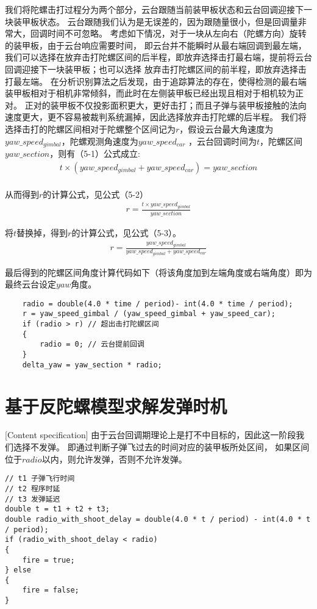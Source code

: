 我们将陀螺击打过程分为两个部分，云台跟随当前装甲板状态和云台回调迎接下一块装甲板状态。
云台跟随我们认为是无误差的，因为跟随量很小，但是回调量非常大，回调时间不可忽略。
考虑如下情况，对于一块从左向右（陀螺方向）旋转的装甲板，由于云台响应需要时间，
即云台并不能瞬时从最右端回调到最左端，
我们可以选择在放弃击打陀螺区间的后半程，即放弃选择击打最右端，提前将云台回调迎接下一块装甲板；也可以选择
放弃击打陀螺区间的前半程，即放弃选择击打最左端。
在分析识别算法之后发现，由于追踪算法的存在，使得检测的最右端装甲板相对于相机非常倾斜，而此时在左侧装甲板已经出现且相对于相机较为正对。
正对的装甲板不仅投影面积更大，更好击打；而且子弹与装甲板接触的法向速度更大，更不容易被裁判系统漏掉，因此选择放弃击打陀螺的后半程。
我们将选择击打的陀螺区间相对于陀螺整个区间记为$r$，假设云台最大角速度为$yaw\_speed_{gimbal}$，陀螺观测角速度为$yaw\_speed_{car}$
，云台回调时间为$t$，陀螺区间$yaw\_section$，则有（5-1）公式成立:
\begin{gather}
    t  \times (yaw\_speed_{gimbal} + yaw\_speed_{car}) = yaw\_section \\
\end{gather}

从而得到$r$的计算公式，见公式（5-2）
\begin{gather}
r = \frac{t \times yaw\_speed_{gimbal} }{yaw\_section}
\end{gather}

将$t$替换掉，得到$r$的计算公式，见公式（5-3）。
\begin{gather}
    r = \frac{yaw\_speed_{gimbal}}{yaw\_speed_{gimbal} + yaw\_speed_{car}}
\end{gather}

最后得到的陀螺区间角度计算代码如下（将该角度加到左端角度或右端角度）即为最终云台设定$yaw$角度。
\begin{lstlisting}
    radio = double(4.0 * time / period)- int(4.0 * time / period);
    r = yaw_speed_gimbal / (yaw_speed_gimbal + yaw_speed_car);
    if (radio > r) // 超出击打陀螺区间
    {
        radio = 0; // 云台提前回调
    }
    delta_yaw = yaw_section * radio;
\end{lstlisting}

\section{基于反陀螺模型求解发弹时机}[Content specification]
由于云台回调期理论上是打不中目标的，因此这一阶段我们选择不发弹。
即通过判断子弹飞过去的时间对应的装甲板所处区间，
如果区间位于$radio$以内，则允许发弹，否则不允许发弹。
\begin{lstlisting}
// t1 子弹飞行时间
// t2 程序时延
// t3 发弹延迟
double t = t1 + t2 + t3;
double radio_with_shoot_delay = double(4.0 * t / period) - int(4.0 * t / period);
if (radio_with_shoot_delay < radio)
{
    fire = true;
} else
{
    fire = false;
}
\end{lstlisting}



